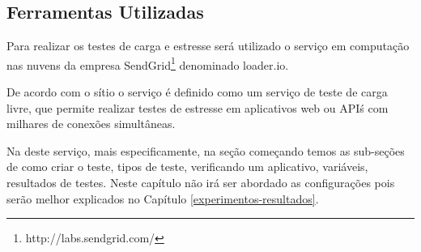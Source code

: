 







\subsection{Ferramentas Utilizadas}
\label{ferramentas-utilizadas-para-testes}
  
  Para realizar os testes de carga e estresse será utilizado o serviço em computação nas nuvens
  da empresa SendGrid\footnote{http://labs.sendgrid.com/} denominado loader.io.
  
  De acordo com o sítio o serviço é definido como um serviço de teste de carga livre,
  que permite realizar testes de estresse em aplicativos web ou API\'s com milhares de conexões simultâneas.
  
  Na  deste serviço, mais especificamente, na seção começando
  temos as sub-seções de como criar o teste, tipos de teste, verificando um aplicativo, variáveis,
  resultados de testes. Neste capítulo não irá ser abordado as configurações pois serão melhor explicados
  no Capítulo \ref{experimentos-resultados}.